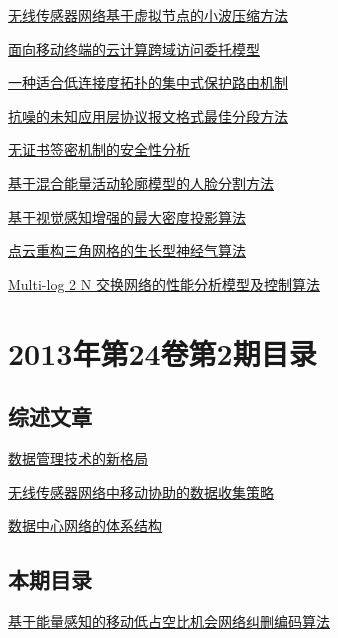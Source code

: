 \documentclass[a4paper]{article}
\begin{document}
\href{http://www.jos.org.cn/ch/reader/download_pdf.aspx?file_no=4235&year_id=2013&quarter_id=3&falg=1}{无线传感器网络基于虚拟节点的小波压缩方法}

\href{http://www.jos.org.cn/ch/reader/download_pdf.aspx?file_no=4242&year_id=2013&quarter_id=3&falg=1}{面向移动终端的云计算跨域访问委托模型}

\href{http://www.jos.org.cn/ch/reader/download_pdf.aspx?file_no=4250&year_id=2013&quarter_id=3&falg=1}{一种适合低连接度拓扑的集中式保护路由机制}

\href{http://www.jos.org.cn/ch/reader/download_pdf.aspx?file_no=4243&year_id=2013&quarter_id=3&falg=1}{抗噪的未知应用层协议报文格式最佳分段方法}

\href{http://www.jos.org.cn/ch/reader/download_pdf.aspx?file_no=4245&year_id=2013&quarter_id=3&falg=1}{无证书签密机制的安全性分析}

\href{http://www.jos.org.cn/ch/reader/download_pdf.aspx?file_no=4249&year_id=2013&quarter_id=3&falg=1}{基于混合能量活动轮廓模型的人脸分割方法}

\href{http://www.jos.org.cn/ch/reader/download_pdf.aspx?file_no=4223&year_id=2013&quarter_id=3&falg=1}{基于视觉感知增强的最大密度投影算法}

\href{http://www.jos.org.cn/ch/reader/download_pdf.aspx?file_no=4293&year_id=2013&quarter_id=3&falg=1}{点云重构三角网格的生长型神经气算法}

\href{http://www.jos.org.cn/ch/reader/download_pdf.aspx?file_no=4251&year_id=2013&quarter_id=3&falg=1}{Multi-log 2 N 交换网络的性能分析模型及控制算法}


\section{\textbf{2013年第24卷第2期目录}}
\subsection{综述文章}
\href{http://www.jos.org.cn/ch/reader/download_pdf.aspx?file_no=4345&year_id=2013&quarter_id=2&falg=1}{数据管理技术的新格局}

\href{http://www.jos.org.cn/ch/reader/download_pdf.aspx?file_no=4349&year_id=2013&quarter_id=2&falg=1}{无线传感器网络中移动协助的数据收集策略}

\href{http://www.jos.org.cn/ch/reader/download_pdf.aspx?file_no=4336&year_id=2013&quarter_id=2&falg=1}{数据中心网络的体系结构}

\subsection{本期目录}
\href{http://www.jos.org.cn/ch/reader/download_pdf.aspx?file_no=4232&year_id=2013&quarter_id=2&falg=1}{基于能量感知的移动低占空比机会网络纠删编码算法}
\end{document}
